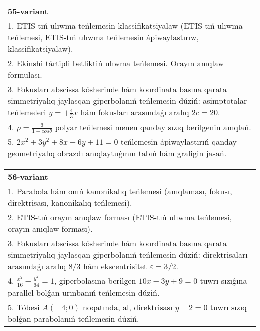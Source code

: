 \documentclass{article}
\begin{document}
\begin{tabular}{m{17cm}}
\textbf{55-variant}\\
1. ETIS-tıń ulıwma teńlemesin klassifikatsiyalaw (ETIS-tıń ulıwma teńlemesi, ETIS-tıń ulıwma teńlemesin ápiwaylastırıw, klassifikatsiyalaw).\\

2. Ekinshi tártipli betliktiń ulıwma teńlemesi. Orayın anıqlaw formulası.\\

3. Fokusları abscissa kósherinde hám koordinata basına qarata simmetriyalıq jaylasqan giperbolanıń teńlemesin dúziń: asimptotalar teńlemeleri $y=\pm \frac{4}{3}x$ hám fokusları arasındaǵı aralıq $2 c=20$.\\

4. $\rho = \frac{6}{1 - cos\theta}$ polyar teńlemesi menen qanday sızıq berilgenin anıqlań.  \\

5. $2x^{2} + 3y^{2} + 8x - 6y + 11 = 0$ teńlemesin ápiwaylastırıń qanday geometriyalıq obrazdı anıqlaytuǵının tabıń hám grafigin jasań.
\end{tabular}
\vspace{1cm}


\begin{tabular}{m{17cm}}
\textbf{56-variant}\\
1. Parabola hám onıń kanonikalıq teńlemesi (anıqlaması, fokusı, direktrisası, kanonikalıq teńlemesi).\\

2. ETIS-tıń orayın anıqlaw forması (ETIS-tıń ulıwma teńlemesi, orayın anıqlaw forması).\\

3. Fokusları abscissa kósherinde hám koordinata basına qarata simmetriyalıq jaylasqan giperbolanıń teńlemesin dúziń: direktrisaları arasındaǵı aralıq $8/3$ hám ekscentrisitet $\varepsilon=3/2$.\\

4. $\frac{x^{2}}{16} - \frac{y^{2}}{64} = 1$, giperbolasına berilgen $10x - 3y + 9 = 0$ tuwrı sızıǵına parallel bolǵan urınbanıń teńlemesin dúziń.  \\

5. Tóbesi $A(-4;0)$ noqatında, al, direktrisası $y - 2 = 0$ tuwrı sızıq bolǵan parabolanıń teńlemesin dúziń.
\end{tabular}
\vspace{1cm}
\end{document}
